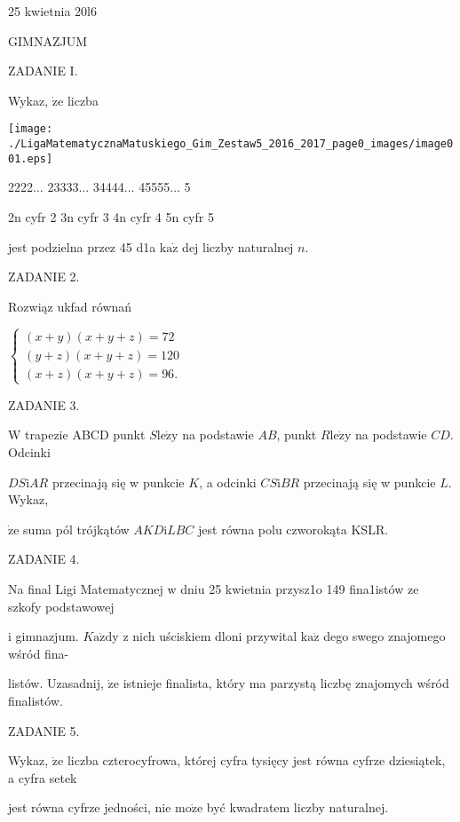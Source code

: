 \documentclass[a4paper,12pt]{article}
\begin{document}
25 kwietnia 20l6

GIMNAZJUM

ZADANIE I.

Wykaz, $\dot{\mathrm{z}}\mathrm{e}$ liczba
\begin{center}
\texttt{[image: ./LigaMatematycznaMatuskiego\_Gim\_Zestaw5\_2016\_2017\_page0\_images/image001.eps]}
\end{center}
2222$\ldots$ 23333$\ldots$ 34444$\ldots$ 45555$\ldots$ 5

2n cyfr 2 3n cyfr 3  4n cyfr 4 5n cyfr 5

jest podzielna przez 45 d1a $\mathrm{k}\mathrm{a}\dot{\mathrm{z}}$ dej liczby naturalnej $n.$

ZADANIE 2.

Rozwiąz ukfad równań

$\left\{\begin{array}{l}
(x+y)(x+y+z)=72\\
(y+z)(x+y+z)=120\\
(x+z)(x+y+z)=96.
\end{array}\right.$

ZADANIE 3.

$\mathrm{W}$ trapezie ABCD punkt $S\mathrm{l}\mathrm{e}\dot{\mathrm{z}}\mathrm{y}$ na podstawie $AB$, punkt $R\mathrm{l}\mathrm{e}\dot{\mathrm{z}}\mathrm{y}$ na podstawie $CD$. Odcinki

$DS\mathrm{i}AR$ przecinają się w punkcie $K$, a odcinki $CS\mathrm{i}BR$ przecinają się w punkcie $L$. Wykaz,

$\dot{\mathrm{z}}\mathrm{e}$ suma pól trójkątów $AKD\mathrm{i}LBC$ jest równa polu czworokąta KSLR.

ZADANIE 4.

Na final Ligi Matematycznej w dniu 25 kwietnia przysz1o 149 fina1istów ze szkofy podstawowej

i gimnazjum. $K\mathrm{a}\dot{\mathrm{z}}\mathrm{d}\mathrm{y}$ z nich uściskiem dloni przywital $\mathrm{k}\mathrm{a}\dot{\mathrm{z}}$ dego swego znajomego wśród fina-

listów. Uzasadnij, $\dot{\mathrm{z}}\mathrm{e}$ istnieje finalista, który ma parzystą liczbę znajomych wśród finalistów.

ZADANIE 5.

Wykaz, $\dot{\mathrm{z}}\mathrm{e}$ liczba czterocyfrowa, której cyfra tysięcy jest równa cyfrze dziesiątek, a cyfra setek

jest równa cyfrze jedności, nie $\mathrm{m}\mathrm{o}\dot{\mathrm{z}}\mathrm{e}$ być kwadratem liczby naturalnej.
\end{document}
